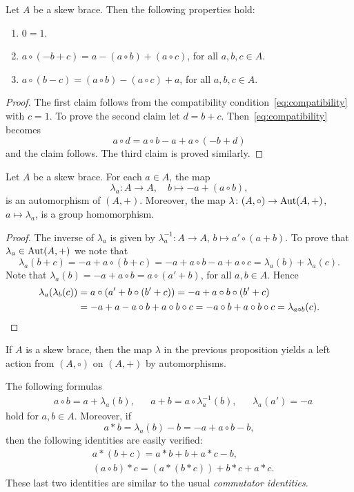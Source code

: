 \begin{lemma}
    \label{lem:basic}
	Let $A$ be a skew brace. Then the following properties hold:
    \begin{enumerate}
        \item $0=1$.  
        \item $a\circ(-b+c)=a-(a\circ b)+(a\circ c)$, for all $a,b,c\in A$.
        \item $a\circ(b-c)=(a\circ b)-(a\circ c)+a$, for all $a,b,c\in A$.
    \end{enumerate}
\end{lemma}

\begin{proof}
		The first claim follows from the compatibility condition~\eqref{eq:compatibility} with
		$c=1$.  To prove the second claim let $d=b+c$.
		Then~\eqref{eq:compatibility} becomes 
		\[
		a\circ d =a\circ b-a+a\circ (-b+d)
		\]
		and the claim follows. The third claim is
		proved similarly.
\end{proof}

\begin{proposition}
\label{pro:lambda}
    Let $A$ be a skew brace. For each $a\in A$, the map
    \[
        \lambda_a\colon A\to A,\quad
        b\mapsto -a+(a\circ b),
    \]
    is an automorphism of $(A,+)$. Moreover, the map 
    $\lambda\colon (A,\circ)\to\operatorname{Aut}(A,+)$, $a\mapsto\lambda_a$, is a group homomorphism. 
\end{proposition}

\begin{proof}
The inverse of $\lambda_a$ is given by $\lambda^{-1}_a\colon A\to A$, $b\mapsto a'\circ (a+b)$. To prove
that $\lambda_a\in\operatorname{Aut}(A,+)$ we note that
\[
\lambda_a(b+c)=-a+a\circ(b+c)=-a+a\circ b-a+a\circ c=\lambda_a(b)+\lambda_a(c).
\]
Note that $\lambda_a(b)=-a+a\circ b=a\circ (a'+b)$, for all $a,b\in A$. Hence 
\begin{align*}
\lambda_a(\lambda_b(c))&=a\circ (a'+b\circ (b'+c))=-a+a\circ b\circ (b'+c)\\
&=-a+a-a\circ b+a\circ b\circ c=-a\circ b+a\circ b\circ c=\lambda_{a\circ b}(c).\qedhere
\end{align*}
\end{proof}

If $A$ is a skew brace, then 
the map $\lambda$ in the previous proposition yields a left action from $(A,\circ)$ on $(A,+)$ by automorphisms. 

The following formulas 
\begin{align}
\label{eq:formulas}
&a\circ b = a+\lambda_a(b),
&&a+b=a\circ \lambda^{-1}_a(b),
&&\lambda_a(a')=-a
\end{align}
hold for $a,b\in A$. Moreover, if 
\[
    a*b=\lambda_a(b)-b=-a+a\circ b-b,
\]
then the following identities are easily verified:
\begin{align}
\label{eq:commutator1}&a*(b+c)=a*b+b+a*c-b,\\
\label{eq:commutator2}&(a\circ b)*c=(a*(b*c))+b*c+a*c.
\end{align}
These last two identities are similar to the usual
\emph{commutator identities}.

